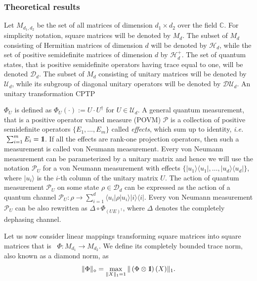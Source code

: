 \documentclass[preprint,12pt, a4paper]{elsarticle}
\newcommand{\ie}{{\emph{i.e.\/}}}
\newcommand{\ket}[1]{\ensuremath{|#1\rangle}}
\newcommand{\bra}[1]{\ensuremath{\langle#1|}}
\newcommand{\ketbra}[2]{\ensuremath{\ket{#1}\bra{#2}}}
\newcommand{\proj}[1]{\ensuremath{\ketbra{#1}{#1}}}
\newcommand{\1}{{\rm 1\hspace{-0.9mm}l}}
\newcommand{\DD}{\mathcal{D}}
\newcommand{\PP}{\mathcal{P}}
\newcommand{\UU}{\mathcal{U}}
\newcommand{\HH}{\mathcal{H}}
\begin{document}
\subsubsection{Theoretical results}



Let $M_{d_1,d_2}$ be the set of all matrices of dimension $d_1 \times d_2$ over
the field $\mathbb{C}$. For  simplicity notation, square matrices will be denoted by
$M_d$.  The subset of $M_d$ consisting of Hermitian matrices of dimension $d$ will  be  denoted  by $\HH_d$,  while  the  set  of  positive semidefinite matrices of dimension $d$ by $\HH_d^+$. The set of quantum states, that is positive semidefinite operators having
trace equal to one, will be denoted $\DD_d$.  The subset of $M_d$ consisting of unitary matrices will be denoted by
$\UU_d$, while its subgroup of diagonal unitary operators will be denoted by
$\DD \UU_d$.  An unitary transformation 
 CPTP 

$\Phi_{U}$ is defined as $\Phi_U(\cdot) := U \cdot U^\dagger$ for  $U \in \UU_d$. A general quantum
measurement, that is a positive operator valued measure (POVM) $\PP$ is a
collection of positive semidefinite operators $\{E_1, \ldots, E_m \}$ called
\emph{effects}, which sum up to identity, \ie $ \, \, \sum_{i=1}^m E_i = \1$. If
all the effects are rank-one projection operators, then such a measurement is
called von Neumann measurement. Every von Neumann measurement can be
parameterized by a unitary matrix and hence we will use the notation $\PP_{U}$
for a von Neumann measurement with effects $\{\proj{u_1}, \ldots, \proj{u_d}\}$,
where $\ket{u_i}$ is the $i$-th column of the unitary matrix $U$. The action of
quantum measurement $\PP_{U}$ on some state $\rho \in \mathcal{D}_d$ can be
expressed as the action of a quantum channel
$
\PP_{U} : \rho \rightarrow \sum_{i=1}^d \bra{u_i} \rho \ket{u_i} \proj{i}.
$ Every von Neumann measurement  $\PP_{U}$ can be also rewritten as $\Delta \circ \Phi_{(UE)^\dagger}$, where $\Delta$ denotes the completely dephasing channel.  


Let us now consider linear mappings transforming  square matrices into square 
matrices 
that is \ $\Phi: M_{d_1} \to M_{d_2}$. 
 We define its completely bounded trace
	norm, also known as a diamond norm, as
	\begin{equation}
	\|\Phi\|_\diamond = \max_{\|X\|_1=1} \| \left(\Phi \otimes \1\right) (X) \|_1.
	\end{equation}
\end{document}
